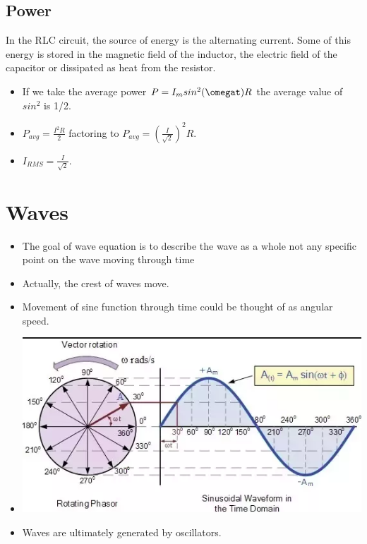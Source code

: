 \documentclass[11pt]{article}
\begin{document}
\hypertarget{power-1}{%
\subsection{Power}\label{power-1}}

In the RLC circuit, the source of energy is the alternating current.
Some of this energy is stored in the magnetic field of the inductor, the
electric field of the capacitor or dissipated as heat from the resistor.

\begin{itemize}
\tightlist
\item
  If we take the average power \(P = I_msin^2(\omegat)R\) the average
  value of \(sin^2\) is 1/2.
\item
  \(P_{avg} = \frac{I^2R}{2}\) factoring to
  \(P_{avg} = (\frac{I}{\sqrt{2}})^2R\).
\item
  \(I_{RMS} = \frac{I}{\sqrt{2}}\).
\end{itemize}

\hypertarget{waves}{%
\section{Waves}\label{waves}}

\begin{itemize}
\tightlist
\item
  The goal of wave equation is to describe the wave as a whole not any
  specific point on the wave moving through time
\item
  Actually, the crest of waves move.
\item
  Movement of sine function through time could be thought of as angular
  speed.
\item
  \includegraphics{physics/img/sinewave.png}
\item
  Waves are ultimately generated by oscillators.
\end{itemize}
\end{document}
